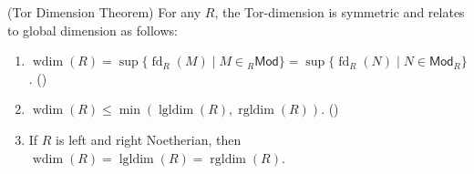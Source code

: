 \begin{theorem} \label{theorem:tor_dimension_theorem_for_rings}
(Tor Dimension Theorem) For any  $R$, the Tor-dimension is symmetric and relates to global dimension as follows:
\begin{enumerate}
    \item $\operatorname{wdim}(R) = \sup \{ \operatorname{fd}_R(M) \mid M \in {}_R\mathsf{Mod} \} = \sup \{ \operatorname{fd}_R(N) \mid N \in \mathsf{Mod}_R \}$. ()
    \item $\operatorname{wdim}(R) \leq \min(\operatorname{lgldim}(R), \operatorname{rgldim}(R))$. ()
    \item If $R$ is left and right Noetherian, then $\operatorname{wdim}(R) = \operatorname{lgldim}(R) = \operatorname{rgldim}(R)$.
\end{enumerate}
\end{theorem}